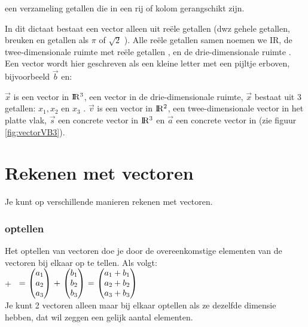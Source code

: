 \documentclass[hidelinks, a4wide, 12pt,  twoside]{book}
\begin{document}
 {een verzameling getallen die in een rij of kolom gerangschikt zijn.}

In dit dictaat bestaat een vector alleen uit reële getallen (dwz gehele getallen, breuken en getallen als $  \pi $ of $ \sqrt{2} $ ). Alle reële getallen samen noemen we \rm I\!R, de twee-dimensionale ruimte met reële getallen \RT, en de drie-dimensionale ruimte \RD.
Een vector wordt hier geschreven als een kleine letter met een pijltje erboven, bijvoorbeeld $\vec{b}$ en: \\


$\vec{x}$ is een  vector in ${\rm I\!R^{3}}$,  een  vector in de drie-dimensionale ruimte, $ \vec{x} $  bestaat uit 3 getallen: $  x_{1},  x_{2} $  en  $ x_{3}$ .  $\vec{v}$  is een  vector in ${\rm I\!R^{2}}$, een twee-dimensionale vector in het platte vlak, $\vec{s}$ een concrete vector in  ${\rm I\!R^{3}}$ en $ \vec{a}  $ een concrete vector in \RT (zie figuur  \ref{fig:vectorVB3}).



\section{Rekenen met vectoren}
Je kunt op verschillende manieren rekenen met vectoren.
\subsubsection{optellen}
Het optellen van vectoren doe je door de overeenkomstige elementen van de vectoren bij elkaar op te tellen. Als volgt:\\

{  +   \  $ = \  \vecdriesnel {a}  \  +  \  \vecdriesnel {b} \   = \  \vecdrie {a_1+b_1}  {a_2+b_2}  {a_3+b_3}  $ \\
	Je kunt 2 vectoren alleen maar bij elkaar optellen als ze dezelfde dimensie hebben, dat wil zeggen een gelijk aantal elementen.} \\ 
\end{document}
